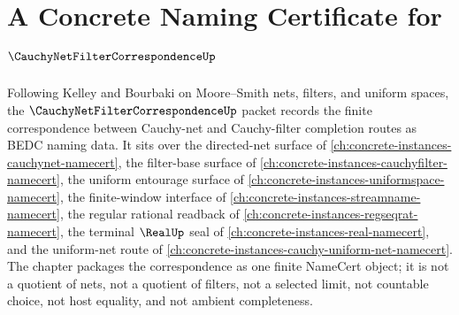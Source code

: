 \chapter{A Concrete Naming Certificate for $\CauchyNetFilterCorrespondenceUp$}
\label{ch:concrete-instances-cauchy-net-filter-correspondence-namecert}

Following Kelley and Bourbaki on Moore--Smith nets, filters, and uniform spaces, the $\CauchyNetFilterCorrespondenceUp$ packet records the finite correspondence between Cauchy-net and Cauchy-filter completion routes as BEDC naming data. It sits over the directed-net surface of \autoref{ch:concrete-instances-cauchynet-namecert}, the filter-base surface of \autoref{ch:concrete-instances-cauchyfilter-namecert}, the uniform entourage surface of \autoref{ch:concrete-instances-uniformspace-namecert}, the finite-window interface of \autoref{ch:concrete-instances-streamname-namecert}, the regular rational readback of \autoref{ch:concrete-instances-regseqrat-namecert}, the terminal $\RealUp$ seal of \autoref{ch:concrete-instances-real-namecert}, and the uniform-net route of \autoref{ch:concrete-instances-cauchy-uniform-net-namecert}. The chapter packages the correspondence as one finite NameCert object; it is not a quotient of nets, not a quotient of filters, not a selected limit, not countable choice, not host equality, and not ambient completeness.

